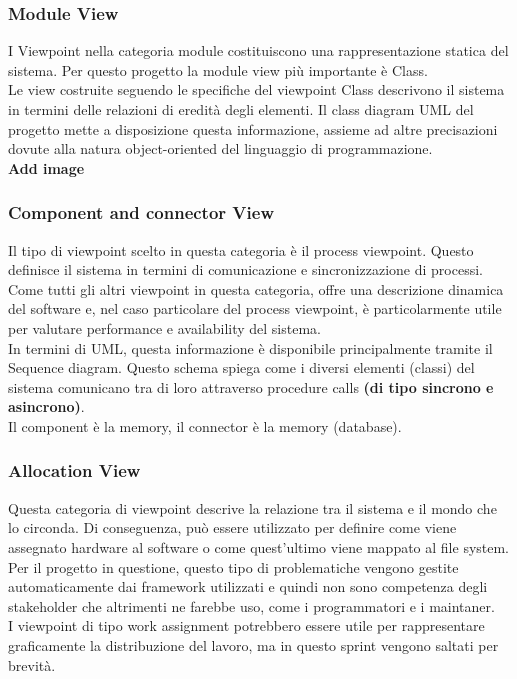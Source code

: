 \documentclass{article}
\begin{document}
\subsubsection{Module View}
I Viewpoint nella categoria module costituiscono una rappresentazione statica del sistema. Per questo progetto la module view più importante è Class. 
\\Le view costruite seguendo le specifiche del viewpoint Class descrivono il sistema in termini delle relazioni di eredità degli elementi. Il class diagram UML del progetto mette a disposizione questa informazione, assieme ad altre precisazioni dovute alla natura object-oriented del linguaggio di programmazione. 
\\\textbf{Add image}
\subsubsection{Component and connector View}
Il tipo di viewpoint scelto in questa categoria è il process viewpoint. Questo definisce il sistema in termini di comunicazione e sincronizzazione di processi. 
\\Come tutti gli altri viewpoint in questa categoria, offre una descrizione dinamica del software e, nel caso particolare del process viewpoint, è particolarmente utile per valutare performance e availability del sistema. 
\\In termini di UML, questa informazione è disponibile principalmente tramite il Sequence diagram. Questo schema spiega come i diversi elementi (classi) del sistema comunicano tra di loro attraverso procedure calls \textbf{(di tipo sincrono e asincrono)}.
\\Il component è la memory, il connector è la memory (database).
\subsubsection{Allocation View}
Questa categoria di viewpoint descrive la relazione tra il sistema e il mondo che lo circonda. Di conseguenza, può essere utilizzato per definire come viene assegnato hardware al software o come quest’ultimo viene mappato al file system. 
\\Per il progetto in questione, questo tipo di problematiche vengono gestite automaticamente dai framework utilizzati e quindi non sono competenza degli stakeholder che altrimenti ne farebbe uso, come i programmatori e i maintaner.
\\I viewpoint di tipo work assignment potrebbero essere utile per rappresentare graficamente la distribuzione del lavoro, ma in questo sprint vengono saltati per brevità. 
\end{document}
